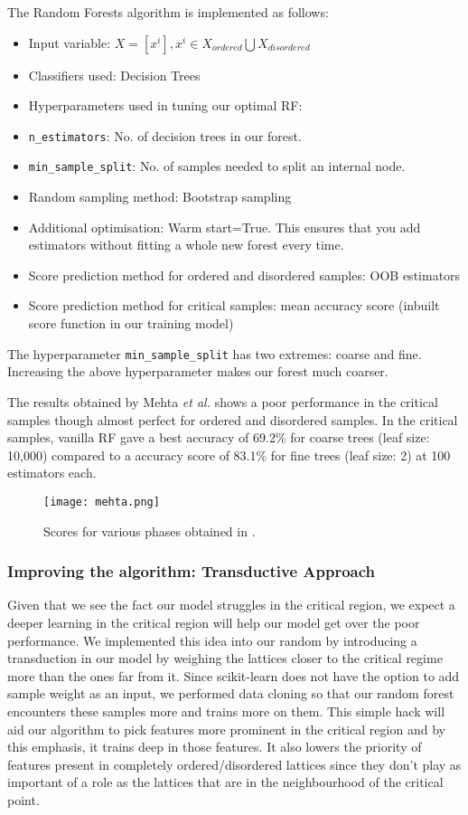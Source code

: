 The Random Forests algorithm is implemented as follows:
\begin{itemize}
    \item Input variable: \(X=[x^i],x^i\in {X_{ordered}\bigcup X_{disordered}}\)
    \item Classifiers used: Decision Trees
    \item Hyperparameters used in tuning our optimal RF:
        \item \texttt{n\_estimators}: No. of decision trees in our forest.
        \item \texttt{min\_sample\_split}: No. of samples needed to split an internal node.
    \item Random sampling method: Bootstrap sampling
    \item Additional optimisation: Warm start=True. This ensures that you add estimators without fitting a whole new forest every time.
    \item Score prediction method for ordered and disordered samples: OOB estimators
    \item Score prediction method for critical samples: mean accuracy score (inbuilt score function in our training model)
\end{itemize}

The hyperparameter \texttt{min\_sample\_split} has two extremes: coarse and fine.
Increasing the above hyperparameter makes our forest much coarser.

The results obtained by Mehta \emph{et al.} \cite{2019} shows a poor performance in the critical samples though almost perfect for ordered and disordered samples. In the critical samples, vanilla RF gave a best accuracy of 69.2\% for coarse trees (leaf size: 10,000) compared to a accuracy score of 83.1\% for fine trees (leaf size: 2) at 100 estimators each.

\begin{figure}[h!]
    \centering
    \texttt{[image: mehta.png]}
    \caption{Scores for various phases obtained in \cite{2019}.}
\end{figure}


\subsubsection{Improving the algorithm: Transductive Approach}
Given that we see the fact our model struggles in the critical region, we expect a deeper learning in the critical region will help our model get over the poor performance.
We implemented this idea into our random by introducing a transduction in our model by weighing the lattices closer to the critical regime more than the ones far from it.
Since scikit-learn does not have the option to add sample weight as an input, we performed data cloning so that our random forest encounters these samples more and trains more on them.
This simple hack will aid our algorithm to pick features more prominent in the critical region and by this emphasis, it trains deep in those features.
It also lowers the priority of features present in completely ordered/disordered lattices since they don’t play as important of a role as the lattices that are in the neighbourhood of the critical point.

